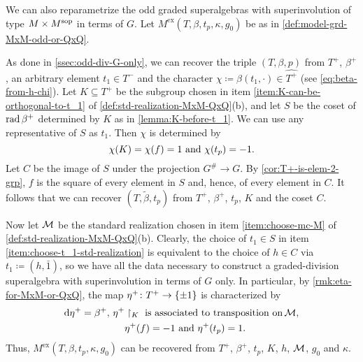 We can also reparametrize the odd graded superalgebras with superinvolution of type $M\times M^{\mathrm{sop}}$ in terms of $G$. 
Let $M^{\mathrm{ex}}(T, \beta, t_p, \kappa, g_0)$ be as in \cref{def:model-grd-MxM-odd-or-QxQ}. 

As done in \cref{ssec:odd-div-G-only}, we can recover the triple $(T, \beta, p)$ from $T^+$, $\beta^+$, an arbitrary element $t_1 \in T^-$ and the character $\chi \coloneqq \beta(t_1, \cdot) \in \widehat{T^+}$ (see \cref{eq:beta-from-h-chi}). 
Let $K \subseteq T^+$ be the subgroup chosen in item \eqref{item:K-can-be-orthogonal-to-t_1} of \cref{def:std-realization-MxM-QxQ}(b), and let $S$ be the coset of $\operatorname{rad} \beta^+$ determined by $K$ as in \cref{lemma:K-before-t_1}. 
We can use any representative of $S$ as $t_1$. 
Then $\chi$ is determined by
\[\label{eq:equivalent-def-of-chi}
    \chi(K) = \chi(f) = 1 \,\,\text{and}\,\, \chi(t_p) = -1.
\]
Let $C$ be the image of $S$ under the projection $G^\# \to G$. 
By \cref{cor:T+-is-elem-2-grp}, $f$ is the square of every element in $S$ and, hence, of every element in $C$.
It follows that we can recover $(T, \tilde\beta, t_p)$ from $T^+$, $\beta^+$, $t_p$, $K$ and the coset $C$. 

Now let $\mathcal M$ be the standard realization chosen in item \eqref{item:choose-mc-M} of \cref{def:std-realization-MxM-QxQ}(b). 
Clearly, the choice of $t_1 \in S$ in item \eqref{item:choose-t_1-std-realization} is equivalent to the choice of $h\in C$ via $t_1 \coloneqq (h, \bar 1)$, so we have all the data necessary to construct a graded-division superalgebra with superinvolution in terms of $G$ only. 
In particular, by \cref{rmk:eta-for-MxM-or-QxQ}, the map $\eta^+\colon T^+ \to \{ \pm 1 \}$ is characterized by
\[\label{eq:eta+-unsharpening-MxM}
    \begin{aligned}
        \mathrm{d}\eta^+ = \beta^+,\, \eta^+&\restriction_{K} \,\, \text{is associated to transposition on}\, \mathcal M,\\ 
        &\eta^+(f) = -1 \,\,\text{and}\,\, \eta^+(t_p) =1. 
    \end{aligned}
\]
Thus, $M^{\mathrm{ex}}(T, \beta, t_p, \kappa, g_0)$ can be recovered from $T^+$, $\beta^+$, $t_p$, $K$, $h$, $\mathcal M$, $g_0$ and $\kappa$. 


